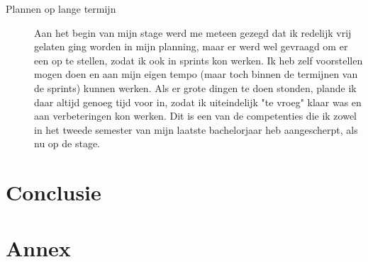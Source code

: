 \documentclass[10pt,a4paper]{article}
\begin{document}
\begin{itemize}
\begin{description}
\item[Plannen op lange termijn] Aan het begin van mijn stage werd me meteen gezegd dat ik redelijk vrij gelaten ging worden in mijn planning, maar er werd wel gevraagd om er een op te stellen, zodat ik ook in sprints kon werken. Ik heb zelf voorstellen mogen doen en aan mijn eigen tempo (maar toch binnen de termijnen van de sprints) kunnen werken. Als er grote dingen te doen stonden, plande ik daar altijd genoeg tijd voor in, zodat ik uiteindelijk "te vroeg" klaar was en aan verbeteringen kon werken. Dit is een van de competenties die ik zowel in het tweede semester van mijn laatste bachelorjaar heb aangescherpt, als nu op de stage.  
\end{description}
\end{itemize}

\section{Conclusie}

\section{Annex}
\end{document}
